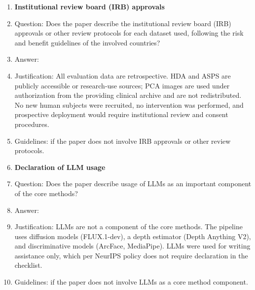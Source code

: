 \begin{enumerate}
\item {\bf Institutional review board (IRB) approvals}
    \item[] Question: Does the paper describe the institutional review board (IRB) approvals or other review protocols for each dataset used, following the risk and benefit guidelines of the involved countries?
    \item[] Answer: \answerNA{}
    \item[] Justification: All evaluation data are retrospective. HDA and ASPS are publicly accessible or research-use sources; PCA images are used under authorization from the providing clinical archive and are not redistributed. No new human subjects were recruited, no intervention was performed, and prospective deployment would require institutional review and consent procedures.
    \item[] Guidelines: \answerNA{} if the paper does not involve IRB approvals or other review protocols.

\item {\bf Declaration of LLM usage}
    \item[] Question: Does the paper describe usage of LLMs as an important component of the core methods?
    \item[] Answer: \answerNA{}
    \item[] Justification: LLMs are not a component of the core methods. The pipeline uses diffusion models (FLUX.1-dev), a depth estimator (Depth Anything V2), and discriminative models (ArcFace, MediaPipe). LLMs were used for writing assistance only, which per NeurIPS policy does not require declaration in the checklist.
    \item[] Guidelines: \answerNA{} if the paper does not involve LLMs as a core method component.

\end{enumerate}
